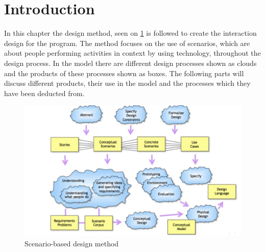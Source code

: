 \section{Introduction}
In this chapter the design method, seen on \cref{scenarioModel} is followed to create the interaction design for the program. The method focuses on the use of scenarios, which are about people performing activities in context by using technology, throughout the design process. In the model there are different design processes shown as clouds and the products of these processes shown as boxes. The following parts will discuss different products, their use in the model and the processes which they have been deducted from.

\begin{figure}[H]
	\centering
	\includegraphics[width=1\textwidth]{Grafik/scenarioModel}
	\caption{Scenario-based design method}
	\label{scenarioModel}
\end{figure}
